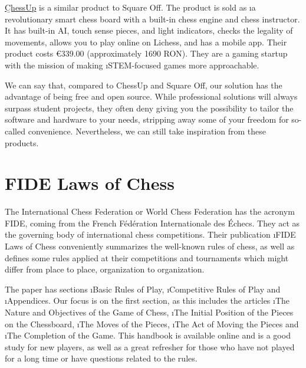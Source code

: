 \href{https://playchessup.com/en-eu}{\b{ChessUp}} is a similar product to Square Off. The product is sold as \i{a revolutionary smart chess board with a built-in chess engine and chess instructor}. It has built-in AI, touch sense pieces, and light indicators, checks the legality of movements, allows you to play online on Lichess, and has a mobile app. Their product costs €339.00 (approximately 1690 RON). They are a gaming startup with the mission of making \i{STEM-focused games more approachable}.

We can say that, compared to ChessUp and Square Off, our solution has the advantage of being free and open source. While professional solutions will always surpass student projects, they often deny giving you the possibility to tailor the software and hardware to your needs, stripping away some of your freedom for so-called convenience. Nevertheless, we can still take inspiration from these products.




\section{FIDE Laws of Chess} \label{subsec:fide-laws-of-chess}

The International Chess Federation or World Chess Federation has the acronym FIDE, coming from the French Fédération Internationale des Échecs. They act as the governing body of international chess competitions. Their publication \i{FIDE Laws of Chess}\cite{fide} conveniently summarizes the well-known rules of chess, as well as defines some rules applied at their competitions and tournaments which might differ from place to place, organization to organization.

The paper has sections \i{Basic Rules of Play}, \i{Competitive Rules of Play} and \i{Appendices}. Our focus is on the first section, as this includes the articles \i{The Nature and Objectives of the Game of Chess}, \i{The Initial Position of the Pieces on the Chessboard}, \i{The Moves of the Pieces}, \i{The Act of Moving the Pieces} and \i{The Completion of the Game}. This handbook is available online and is a good study for new players, as well as a great refresher for those who have not played for a long time or have questions related to the rules.



